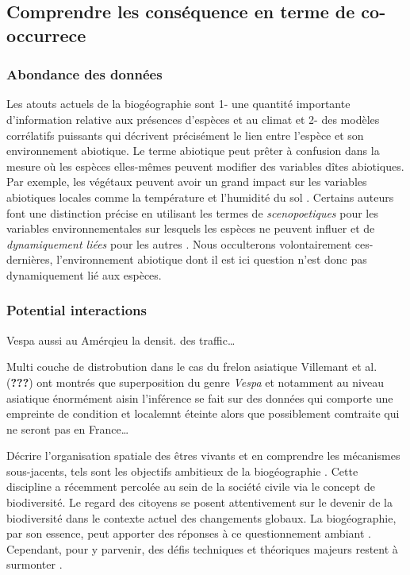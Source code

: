 \subsection*{Comprendre les conséquence en terme de
co-occurrece}\label{comprendre-les-consuxe9quence-en-terme-de-co-occurrece}

\subsubsection*{Abondance des données}\label{abondance-des-donnuxe9es}

Les atouts actuels de la biogéographie sont 1- une quantité importante
d'information relative aux présences d'espèces et au climat et 2- des
modèles corrélatifs puissants qui décrivent précisément le lien entre
l'espèce et son environnement abiotique. Le terme abiotique peut prêter
à confusion dans la mesure où les espèces elles-mêmes peuvent modifier
des variables dîtes abiotiques. Par exemple, les végétaux peuvent avoir
un grand impact sur les variables abiotiques locales comme la
température et l'humidité du sol \cite{Breshears1998}. Certains auteurs
font une distinction précise en utilisant les termes de
\textit{scenopoetiques} pour les variables environnementales sur
lesquels les espèces ne peuvent influer et de
\textit{dynamiquement liées} pour les autres \cite{Peterson2011}. Nous
occulterons volontairement ces-dernières, l'environnement abiotique dont
il est ici question n'est donc pas dynamiquement lié aux espèces.

\subsubsection*{Potential interactions}\label{potential-interactions}

Vespa aussi au Amérqieu la densit. des traffic\ldots{}

Multi couche de distrobution dans le cas du frelon asiatique Villemant
et al. ({\textbf{???}}) ont montrés que superposition du genre
\emph{Vespa} et notamment au niveau asiatique énormément aisin
l'inférence se fait sur des données qui comporte une empreinte de
condition et localemnt éteinte alors que possiblement comtraite qui ne
seront pas en France\ldots{}

Décrire l'organisation spatiale des êtres vivants et en comprendre les
mécanismes sous-jacents, tels sont les objectifs ambitieux de la
biogéographie \cite{MacArthur1967}. Cette discipline a récemment
percolée au sein de la société civile via le concept de biodiversité. Le
regard des citoyens se posent attentivement sur le devenir de la
biodiversité dans le contexte actuel des changements globaux. La
biogéographie, par son essence, peut apporter des réponses à ce
questionnement ambiant \cite{Whittaker2005}. Cependant, pour y parvenir,
des défis techniques et théoriques majeurs restent à surmonter
\cite{Beck2012}.

